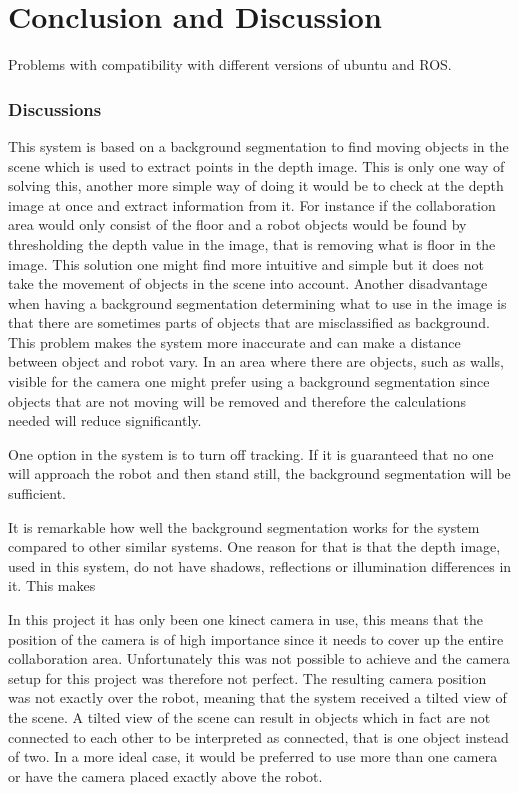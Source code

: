 \section{Conclusion and Discussion}
Problems with compatibility with different versions of ubuntu and ROS.  

\subsubsection{Discussions}
This system is based on a background segmentation to find moving objects in the scene which is used to extract points in the depth image. This is only one way of solving this, another more simple way of doing it would be to check at the depth image at once and extract information from it. For instance if the collaboration area would only consist of the floor and a robot objects would be found by thresholding the depth value in the image, that is removing what is floor in the image. This solution one might find more intuitive and simple but it does not take the movement of objects in the scene into account. Another disadvantage when having a background segmentation determining what to use in the image is that there are sometimes parts of objects that are misclassified as background. This problem makes the system more inaccurate and can make a distance between object and robot vary. In an area where there are objects, such as walls, visible for the camera one might prefer using a background segmentation since objects that are not moving will be removed and therefore the calculations needed will reduce significantly.  

One option in the system is to turn off tracking. If it is guaranteed that no one will approach the robot and then stand still, the background segmentation will be sufficient.  

It is remarkable how well the background segmentation works for the system compared to other similar systems. One reason for that is that the depth image, used in this system, do not have shadows, reflections or illumination differences in it. This makes 

In this project it has only been one kinect camera in use, this means that the position of the camera is of high importance since it needs to cover up the entire collaboration area. Unfortunately this was not possible to achieve and the camera setup for this project was therefore not perfect. The resulting camera position was not exactly over the robot, meaning that the system received a tilted view of the scene. A tilted view of the scene can result in objects which in fact are not connected to each other to be interpreted as connected, that is one object instead of two. In a more ideal case, it would be preferred to use more than one camera or have the camera placed exactly above the robot. 

